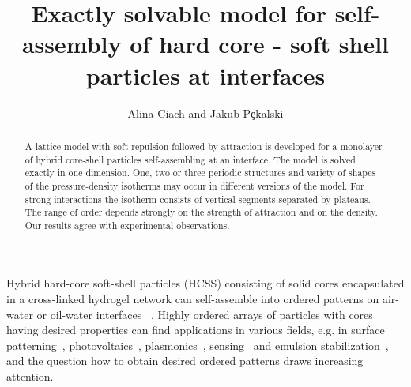 \documentclass[preprint,
prl,%
aps]{revtex4}
\begin{document}
\title{Exactly solvable model for self-assembly of hard core - soft shell particles at interfaces}
\author{ Alina Ciach and Jakub P\c ekalski }
\address{
Institute of Physical Chemistry, Polish Academy of Sciences,
Kasprzaka 44/52, 01-224 Warsaw, Poland}
 \begin{abstract}
 A lattice model with soft repulsion followed by attraction is developed for a monolayer of 
 hybrid core-shell particles self-assembling
 at an interface. The model is solved exactly in one dimension. 
 One, two or three periodic structures and variety of shapes
 of the pressure-density isotherms may occur in different versions of the model. For strong interactions the isotherm
 consists of vertical segments separated by plateaus.
 The range of order depends  strongly on the strength of 
 attraction and on the density. Our results agree  with experimental observations. 
 \end{abstract}

 \maketitle              


Hybrid hard-core soft-shell particles (HCSS) consisting of solid cores 
encapsulated in a cross-linked hydrogel network 
can self-assemble into ordered patterns on air-water or oil-water interfaces 
~\cite{vogel:12:0,nazli:13:0,volk:15:0,honold:15:0,geisel:15:0,rauh:16:0,karg:16:0}.
 Highly ordered arrays of particles with cores having desired properties
 can find applications in various fields, e.g. in surface patterning~\cite{rey:16:0}, photovoltaics~\cite{atwater:10:0}, 
 plasmonics~\cite{noginov:09:0}, sensing~\cite{willets:07:0} and
 emulsion stabilization~\cite{nazli:13:0}, and the question how to obtain desired 
 ordered patterns draws increasing attention.
 
\end{document}
